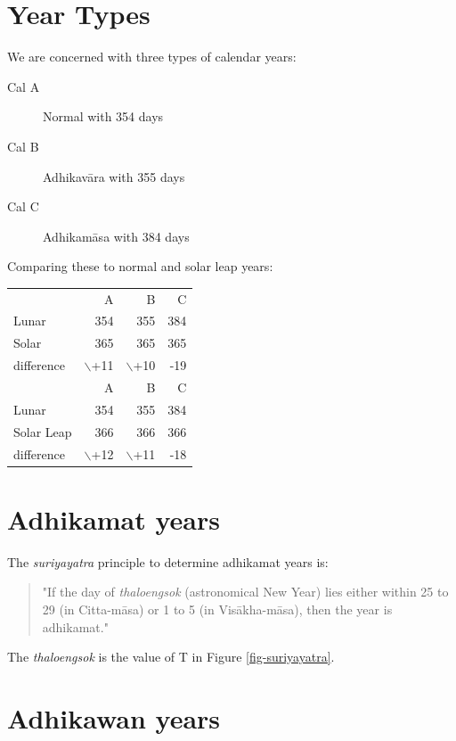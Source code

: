 \documentclass[11pt,oneside]{memoir-article}
\begin{document}
\section{Year Types}
\label{sec-4-1}

We are concerned with three types of calendar years:

\begin{description}
\item[{Cal A}] Normal with 354 days
\item[{Cal B}] Adhikavāra with 355 days
\item[{Cal C}] Adhikamāsa with 384 days
\end{description}

Comparing these to normal and solar leap years:

\begin{center}
\begin{tabular}{lrrr}
 & A & B & C\\
Lunar & 354 & 355 & 384\\
Solar & 365 & 365 & 365\\
difference & $\backslash$+11 & $\backslash$+10 & -19\\
\hline
 & A & B & C\\
Lunar & 354 & 355 & 384\\
Solar Leap & 366 & 366 & 366\\
difference & $\backslash$+12 & $\backslash$+11 & -18\\
\end{tabular}
\end{center}

\section{Adhikamat years}
\label{sec-4-2}

The \emph{suriyayatra} principle to determine adhikamat years is:

\begin{quote}
"If the day of \emph{thaloengsok} (astronomical New Year)
lies either within 25 to 29 (in Citta-māsa) or 1 to 5 (in
Visākha-māsa), then the year is adhikamat."\cite{prasert-ngan}
\end{quote}

The \emph{thaloengsok} is the value of T in Figure \ref{fig-suriyayatra}.

\section{Adhikawan years}
\label{sec-4-3}
\end{document}
